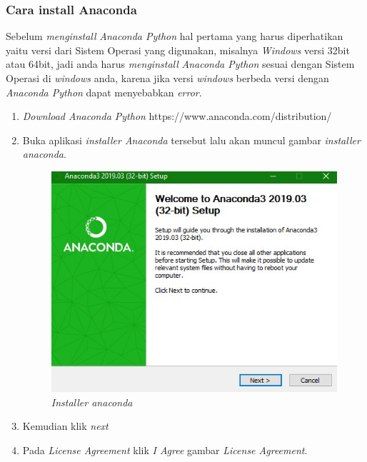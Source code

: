 \subsubsection{Cara install Anaconda}
\par
	Sebelum \textit{menginstall} \textit{Anaconda Python} hal pertama yang harus diperhatikan yaitu versi dari Sistem Operasi yang digunakan, misalnya \textit{Windows} versi 32bit atau 64bit, jadi anda harus \textit{menginstall} \textit{Anaconda Python} sesuai dengan Sistem Operasi di \textit{windows} anda, karena jika versi \textit{windows} berbeda versi dengan \textit{Anaconda Python} dapat menyebabkan \textit{error}.\\
\begin{enumerate}
\item \textit{Download Anaconda Python} https://www.anaconda.com/distribution/

\item Buka aplikasi \textit{installer Anaconda} tersebut lalu akan muncul  gambar \textit{installer anaconda}.

\begin{figure}[!htbp]
    \centering
    \includegraphics[scale=0.5]{figures/b.jpg}
    \caption{\textit{Installer anaconda}}
    \label{Figureanaconda2}
\end{figure}

\item Kemudian klik \textit{next}
\item Pada \textit{License Agreement} klik \textit{I Agree}
 gambar \textit{License Agreement}.


\end{enumerate}
